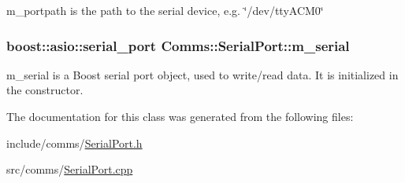 m\-\_\-portpath is the path to the serial device, e.\-g. \char`\"{}/dev/tty\-A\-C\-M0\char`\"{} 

\hypertarget{classComms_1_1SerialPort_a4a708bd17e0f5e20f23b32c1e0db9568}{
\subsubsection[{m\-\_\-serial}]{\setlength{\rightskip}{0pt plus 5cm}boost\-::asio\-::serial\-\_\-port Comms\-::\-Serial\-Port\-::m\-\_\-serial\hspace{0.3cm}{\ttfamily [private]}}}\label{classComms_1_1SerialPort_a4a708bd17e0f5e20f23b32c1e0db9568}


m\-\_\-serial is a Boost serial port object, used to write/read data. It is initialized in the constructor. 



The documentation for this class was generated from the following files\-:\begin{DoxyCompactItemize}
\item 
include/comms/\hyperlink{SerialPort_8h}{Serial\-Port.\-h}\item 
src/comms/\hyperlink{SerialPort_8cpp}{Serial\-Port.\-cpp}\end{DoxyCompactItemize}
